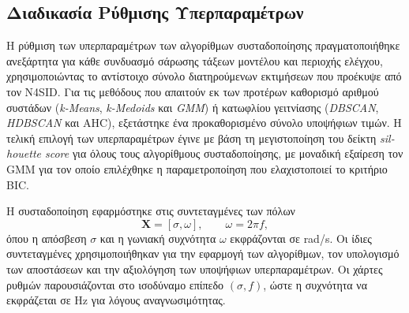 \subsection{Διαδικασία Ρύθμισης Υπερπαραμέτρων}
\label{amb:clustering-tuning}
Η ρύθμιση των υπερπαραμέτρων των αλγορίθμων συσταδοποίησης πραγματοποιήθηκε ανεξάρτητα για κάθε συνδυασμό σάρωσης τάξεων μοντέλου και περιοχής ελέγχου,
χρησιμοποιώντας το αντίστοιχο σύνολο διατηρούμενων εκτιμήσεων που προέκυψε από τον N4SID. Για τις μεθόδους που απαιτούν εκ των προτέρων
καθορισμό αριθμού συστάδων (\textenglish{\textit{k-Means}}, \textenglish{\textit{k-Medoids}} και \textenglish{\textit{GMM}}) ή κατωφλίου γειτνίασης (\textenglish{\textit{DBSCAN}}, \textenglish{\textit{HDBSCAN}} και AHC), εξετάστηκε ένα προκαθορισμένο σύνολο υποψήφιων τιμών. Η τελική επιλογή των υπερπαραμέτρων έγινε με βάση τη μεγιστοποίηση του δείκτη \textenglish{\textit{silhouette score}} για όλους τους αλγορίθμους συσταδοποίησης, με μοναδική εξαίρεση τον GMM για τον οποίο επιλέχθηκε η παραμετροποίηση που ελαχιστοποιεί το κριτήριο BIC.

Η συσταδοποίηση εφαρμόστηκε στις συντεταγμένες των πόλων
\[
\mathbf{X}=[\sigma,\omega],
\qquad
\omega=2\pi f,
\]
όπου η απόσβεση $\sigma$ και η γωνιακή συχνότητα $\omega$ εκφράζονται
σε rad/s. Οι ίδιες συντεταγμένες χρησιμοποιήθηκαν για την εφαρμογή των
αλγορίθμων, τον υπολογισμό των αποστάσεων και την αξιολόγηση των
υποψήφιων υπερπαραμέτρων. Οι χάρτες ρυθμών παρουσιάζονται στο ισοδύναμο επίπεδο
$(\sigma,f)$, ώστε η συχνότητα να εκφράζεται σε Hz για λόγους αναγνωσιμότητας.

